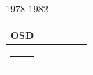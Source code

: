 \documentclass[ xcolor = pdftex, dvipsnames, table ]{beamer}
\makeatletter
\def\hlinewd#1{
\noalign{\ifnum0=`}\fi\hrule \@height #1
\futurelet\reserve@a\@xhline}
\makeatother
\begin{document}
\begin{frame}{1978-1982}
\begin{minipage}[c]{0.49\textwidth}
{\begin{tabular}{|c|c|c|c|c|c|}
        OSD&\cellcolor[HTML]{FF7F00}&\cellcolor[HTML]{FF7F00}&\cellcolor[HTML]{FF7F00}&\cellcolor[HTML]{984EA3}&\cellcolor[HTML]{FFFF33}\\ \hline \noalign{\vspace{-0.33cm}}\hlinewd{2pt}\noalign{\vspace{0.33cm}\vspace{-2pt}}
\end{tabular}}
\end{minipage}

\end{frame}
\end{document}
